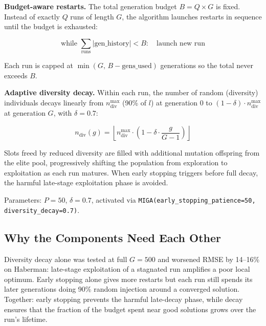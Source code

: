 \textbf{Budget-aware restarts.} The total generation budget $B = Q \times G$ is fixed. Instead of exactly $Q$ runs of length $G$, the algorithm launches restarts in sequence until the budget is exhausted:

\begin{equation}
    \text{while } \sum_{\text{runs}} |\text{gen\_history}| < B: \quad \text{launch new run}
\end{equation}

Each run is capped at $\min(G,\, B - \text{gens\_used})$ generations so the total never exceeds $B$.

\textbf{Adaptive diversity decay.} Within each run, the number of random (diversity) individuals decays linearly from $n_{\text{div}}^{\max}$ (90\% of $l$) at generation 0 to $(1-\delta) \cdot n_{\text{div}}^{\max}$ at generation $G$, with $\delta = 0.7$:

\begin{equation}
    n_{\text{div}}(g) = \left\lfloor n_{\text{div}}^{\max} \cdot \left(1 - \delta \cdot \frac{g}{G-1}\right) \right\rfloor
\end{equation}

Slots freed by reduced diversity are filled with additional mutation offspring from the elite pool, progressively shifting the population from exploration to exploitation as each run matures. When early stopping triggers before full decay, the harmful late-stage exploitation phase is avoided.

Parameters: $P = 50$, $\delta = 0.7$, activated via \texttt{MIGA(early\_stopping\_patience=50, diversity\_decay=0.7)}.

\subsection{Why the Components Need Each Other}

Diversity decay alone was tested at full $G=500$ and worsened RMSE by 14--16\% on Haberman: late-stage exploitation of a stagnated run amplifies a poor local optimum. Early stopping alone gives more restarts but each run still spends its later generations doing 90\% random injection around a converged solution. Together: early stopping prevents the harmful late-decay phase, while decay ensures that the fraction of the budget spent near good solutions grows over the run's lifetime.


